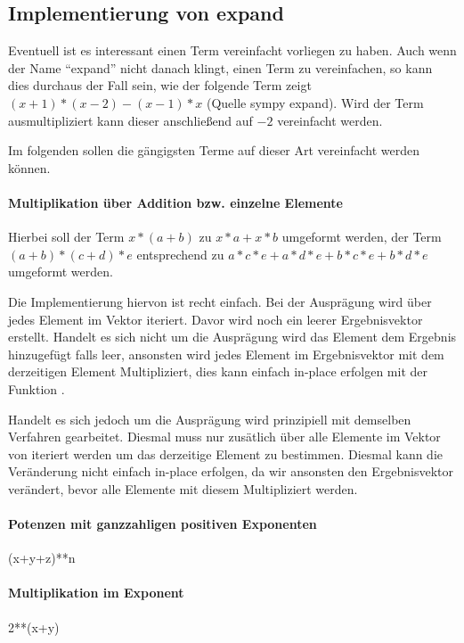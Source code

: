 \documentclass[11pt,a4paper, ngerman]{article}
\begin{document}
\subsection{Implementierung von expand}
Eventuell ist es interessant einen Term vereinfacht vorliegen zu haben. Auch wenn der Name ``expand'' nicht danach klingt, einen Term zu vereinfachen, so kann dies durchaus der Fall sein, wie der folgende Term zeigt $(x + 1)*(x - 2) - (x - 1)*x$ (Quelle sympy expand). Wird der Term ausmultipliziert kann dieser anschließend auf $-2$ vereinfacht werden.

Im folgenden sollen die gängigsten Terme auf dieser Art vereinfacht werden können.

\paragraph{Multiplikation über Addition bzw. einzelne Elemente} Hierbei soll der Term $x*(a+b)$ zu $x*a+x*b$ umgeformt werden, der Term $(a+b)*(c+d)*e$ entsprechend zu $a*c*e + a*d*e + b*c*e + b*d*e$ umgeformt werden.

Die Implementierung hiervon ist recht einfach. Bei der Ausprägung  wird über jedes Element im Vektor iteriert. Davor wird noch ein leerer Ergebnisvektor erstellt. Handelt es sich nicht um die Ausprägung  wird das Element dem Ergebnis hinzugefügt falls leer, ansonsten wird jedes Element im Ergebnisvektor mit dem derzeitigen Element Multipliziert, dies kann einfach in-place erfolgen mit der Funktion .

Handelt es sich jedoch um die Ausprägung  wird prinzipiell mit demselben Verfahren gearbeitet. Diesmal muss nur zusätlich über alle Elemente im Vektor von  iteriert werden um das derzeitige Element zu bestimmen. Diesmal kann die Veränderung nicht einfach in-place erfolgen, da wir ansonsten den Ergebnisvektor verändert, bevor alle Elemente mit diesem Multipliziert werden.

\paragraph{Potenzen mit ganzzahligen positiven Exponenten} (x+y+z)**n

\paragraph{Multiplikation im Exponent} 2**(x+y)
\end{document}
